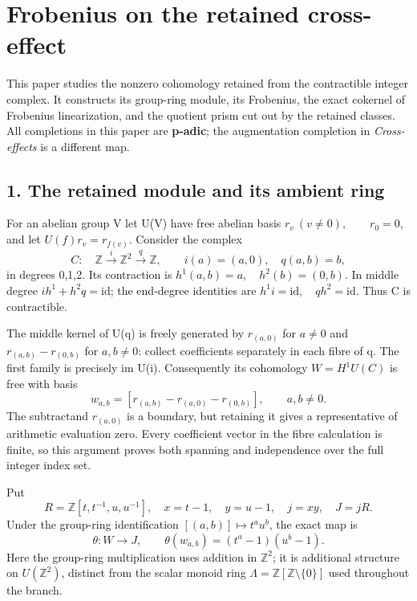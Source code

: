 \documentclass[
]{article}
\author{}
\date{}
\begin{document}
{
\setcounter{tocdepth}{3}
\tableofcontents
}
\section{Frobenius on the retained
cross-effect}\label{frobenius-on-the-retained-cross-effect}

This paper studies the nonzero cohomology retained from the contractible
integer complex. It constructs its group-ring module, its Frobenius, the
exact cokernel of Frobenius linearization, and the quotient prism cut
out by the retained classes. All completions in this paper are
\textbf{p-adic}; the augmentation completion in \emph{Cross-effects} is
a different map.

\subsection{1. The retained module and its ambient
ring}\label{the-retained-module-and-its-ambient-ring}

For an abelian group V let U(V) have free abelian basis
\(r_v\ (v\ne0),\qquad r_0=0\), and let \(U(f)r_v=r_{f(v)}\). Consider
the complex \[
C:\quad\mathbb Z\xrightarrow{i}\mathbb Z^2\xrightarrow{q}\mathbb Z,
\qquad i(a)=(a,0),\quad q(a,b)=b,
\tag{F1}
\] in degrees 0,1,2. Its contraction is
\(h^1(a,b)=a,\quad h^2(b)=(0,b)\). In middle degree
\(ih^1+h^2q=\mathrm{id}\); the end-degree identities are
\(h^1i=\mathrm{id},\quad qh^2=\mathrm{id}\). Thus C is contractible.

The middle kernel of U(q) is freely generated by \(r_{(a,0)}\) for
\(a\ne0\) and \(r_{(a,b)}-r_{(0,b)}\) for \(a,b\ne0\): collect
coefficients separately in each fibre of q. The first family is
precisely im U(i). Consequently its cohomology \(W=H^1U(C)\) is free
with basis \[
w_{a,b}=[r_{(a,b)}-r_{(a,0)}-r_{(0,b)}],\qquad a,b\ne0.
\tag{F2}
\] The subtractand \(r_{(a,0)}\) is a boundary, but retaining it gives a
representative of arithmetic evaluation zero. Every coefficient vector
in the fibre calculation is finite, so this argument proves both
spanning and independence over the full integer index set.

Put \[
R=\mathbb Z[t,t^{-1},u,u^{-1}],\quad x=t-1,\quad y=u-1,
\quad j=xy,\quad J=jR.
\tag{F3}
\] Under the group-ring identification \([(a,b)]\mapsto t^a u^b\), the
exact map is \[
\theta:W\longrightarrow J,\qquad
\theta(w_{a,b})=(t^a-1)(u^b-1).
\tag{F4}
\] Here the group-ring multiplication uses addition in \(\mathbb Z^2\);
it is additional structure on \(U(\mathbb Z^2)\), distinct from the
scalar monoid ring \(\Lambda=\mathbb Z[\mathbb Z\setminus\{0\}]\) used
throughout the branch.
\end{document}
